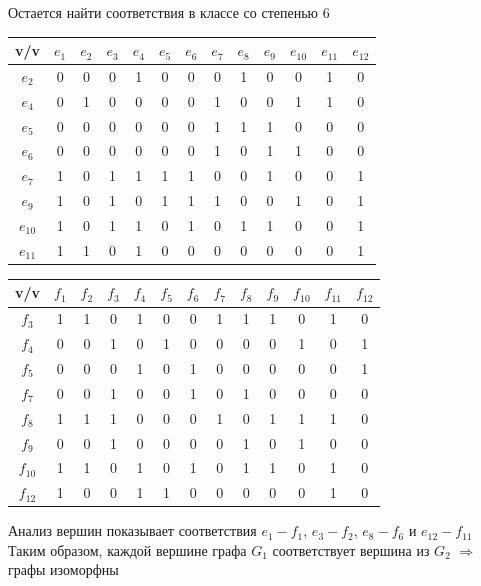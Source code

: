 \documentclass[a4paper,12pt]{article}
\begin{document}
\noindent
Остается найти соответствия в классе со степенью $6$ \\

\begin{table}[H]
    \centering
    \begin{tabular}{|c|c|c|c|c|c|c|c|c|c|c|c|c|}
    \hline
        v/v & $e_1$ & $e_2$ & $e_3$ & $e_4$ & $e_5$ & $e_6$ & $e_7$ & $e_8$ & $e_9$ & $e_{10}$ & $e_{11}$ & $e_{12}$ \\ \hline
        $e_2$ & 0 & 0 & 0 & 1 & 0 & 0 & 0 & 1 & 0 & 0 & 1 & 0 \\ \hline
        $e_4$ & 0 & 1 & 0 & 0 & 0 & 0 & 1 & 0 & 0 & 1 & 1 & 0 \\ \hline
        $e_5$ & 0 & 0 & 0 & 0 & 0 & 0 & 1 & 1 & 1 & 0 & 0 & 0 \\ \hline
        $e_6$ & 0 & 0 & 0 & 0 & 0 & 0 & 1 & 0 & 1 & 1 & 0 & 0 \\ \hline
        $e_7$ & 1 & 0 & 1 & 1 & 1 & 1 & 0 & 0 & 1 & 0 & 0 & 1 \\ \hline
        $e_9$ & 1 & 0 & 1 & 0 & 1 & 1 & 1 & 0 & 0 & 1 & 0 & 1 \\ \hline
        $e_{10}$ & 1 & 0 & 1 & 1 & 0 & 1 & 0 & 1 & 1 & 0 & 0 & 1 \\ \hline
        $e_{11}$ & 1 & 1 & 0 & 1 & 0 & 0 & 0 & 0 & 0 & 0 & 0 & 1 \\ \hline
    \end{tabular}
\end{table}

\begin{table}[H]
    \centering
    \begin{tabular}{|c|c|c|c|c|c|c|c|c|c|c|c|c|}
    \hline
        v/v & $f_1$ & $f_2$ & $f_3$ & $f_4$ & $f_5$ & $f_6$ & $f_7$ & $f_8$ & $f_9$ & $f_{10}$ & $f_{11}$ & $f_{12}$ \\ \hline
        $f_3$ & 1 & 1 & 0 & 1 & 0 & 0 & 1 & 1 & 1 & 0 & 1 & 0 \\ \hline
        $f_4$ & 0 & 0 & 1 & 0 & 1 & 0 & 0 & 0 & 0 & 1 & 0 & 1 \\ \hline
        $f_5$ & 0 & 0 & 0 & 1 & 0 & 1 & 0 & 0 & 0 & 0 & 0 & 1 \\ \hline
        $f_7$ & 0 & 0 & 1 & 0 & 0 & 1 & 0 & 1 & 0 & 0 & 0 & 0 \\ \hline
        $f_8$ & 1 & 1 & 1 & 0 & 0 & 0 & 1 & 0 & 1 & 1 & 1 & 0 \\ \hline
        $f_9$ & 0 & 0 & 1 & 0 & 0 & 0 & 0 & 1 & 0 & 1 & 0 & 0 \\ \hline
        $f_{10}$ & 1 & 1 & 0 & 1 & 0 & 1 & 0 & 1 & 1 & 0 & 1 & 0 \\ \hline
        $f_{12}$ & 1 & 0 & 0 & 1 & 1 & 0 & 0 & 0 & 0 & 0 & 1 & 0 \\ \hline
    \end{tabular}
\end{table}

\noindent
Анализ вершин показывает соответствия $e_1 - f_1$, $e_3 - f_2$, $e_8 - f_6$ и $e_{12} - f_{11}$ \\

\noindent
Таким образом, каждой вершине графа $G_1$ соответствует вершина из $G_2$ $\Rightarrow$ графы изоморфны
\end{document}
